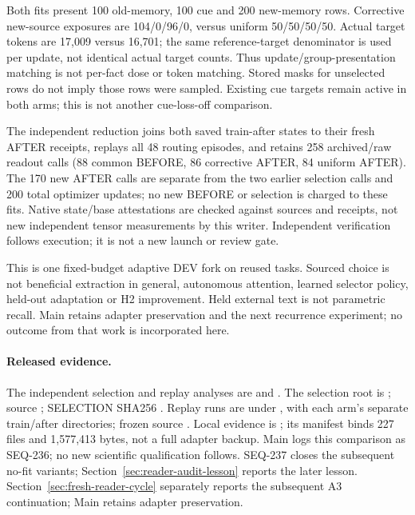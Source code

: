 \documentclass[11pt]{article}
\begin{document}
Both fits present 100 old-memory, 100 cue and 200 new-memory rows. Corrective
new-source exposures are 104/0/96/0, versus uniform 50/50/50/50. Actual target
tokens are 17,009 versus 16,701; the same reference-target denominator is used
per update, not identical actual target counts. Thus update/group-presentation
matching is not per-fact dose or token matching. Stored masks for unselected
rows do not imply those rows were sampled. Existing cue targets remain active
in both arms; this is not another cue-loss-off comparison.

The independent reduction joins both saved train-after states to their fresh
AFTER receipts, replays all 48 routing episodes, and retains 258 archived/raw
readout calls (88 common BEFORE, 86 corrective AFTER, 84 uniform AFTER). The
170 new AFTER calls are separate from the two earlier selection calls and 200
total optimizer updates; no new BEFORE or selection is charged to these fits.
Native state/base attestations are checked against sources and receipts, not
new independent tensor measurements by this writer. Independent verification
follows execution; it is not a new launch or review gate.

This is one fixed-budget adaptive DEV fork on reused tasks. Sourced choice is
not beneficial extraction in general, autonomous attention, learned selector
policy, held-out adaptation or H2 improvement. Held external text is not
parametric recall. Main retains adapter preservation and the next recurrence
experiment; no outcome from that work is incorporated here.

\paragraph{Released evidence.}
The independent selection and replay analyses are
and .
The selection root is
;
source ; SELECTION SHA256
.
Replay runs are under
,
with each arm's separate train/after directories; frozen source
.
Local evidence is ;
its manifest binds 227 files and 1,577,413 bytes, not a full adapter backup.
Main logs this comparison as SEQ-236; no new scientific qualification follows.
SEQ-237 closes the subsequent no-fit variants; Section~\ref{sec:reader-audit-lesson}
reports the later lesson. Section~\ref{sec:fresh-reader-cycle} separately reports
the subsequent A3 continuation; Main retains adapter preservation.
\end{document}
